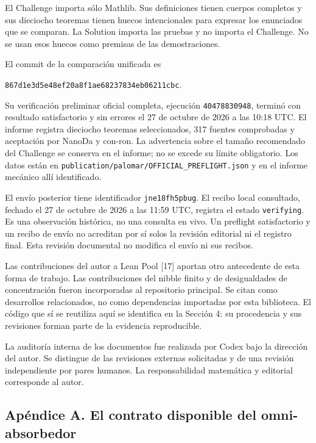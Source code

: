 \documentclass[spanish,11pt,a4paper]{article}
\begin{document}
El Challenge importa sólo Mathlib. Sus definiciones tienen cuerpos completos y sus dieciocho teoremas tienen huecos intencionales para expresar los enunciados que se comparan. La Solution importa las pruebas y no importa el Challenge. No se usan esos huecos como premisas de las demostraciones.

El commit de la comparación unificada es

\texttt{867d1e3d\allowbreak{}5e48ef20\allowbreak{}a8f1ae68\allowbreak{}237834eb\allowbreak{}06211cbc}.

Su verificación preliminar oficial completa, ejecución \texttt{40478830948}, terminó con resultado satisfactorio y sin errores el 27 de octubre de 2026 a las 10:18 UTC. El informe registra dieciocho teoremas seleccionados, 317 fuentes comprobadas y aceptación por NanoDa y con-ron. La advertencia sobre el tamaño recomendado del Challenge se conserva en el informe; no se excede su límite obligatorio. Los datos están en \texttt{publication/\allowbreak{}palomar/\allowbreak{}OFFICIAL\_\allowbreak{}PREFLIGHT.\allowbreak{}json} y en el informe mecánico allí identificado.

El envío posterior tiene identificador \texttt{jne18fh5pbug}. El recibo local consultado, fechado el 27 de octubre de 2026 a las 11:59 UTC, registra el estado \texttt{verifying}. Es una observación histórica, no una consulta en vivo. Un preflight satisfactorio y un recibo de envío no acreditan por sí solos la revisión editorial ni el registro final. Esta revisión documental no modifica el envío ni sus recibos.

Las contribuciones del autor a Lean Pool {[}17{]} aportan otro antecedente de esta forma de trabajo. Las contribuciones del nibble finito y de desigualdades de concentración fueron incorporadas al repositorio principal. Se citan como desarrollos relacionados, no como dependencias importadas por esta biblioteca. El código que sí se reutiliza aquí se identifica en la Sección 4: su procedencia y sus revisiones forman parte de la evidencia reproducible.

La auditoría interna de los documentos fue realizada por Codex bajo la dirección del autor. Se distingue de las revisiones externas solicitadas y de una revisión independiente por pares humanos. La responsabilidad matemática y editorial corresponde al autor.

\subsection{Apéndice A. El contrato disponible del omni-absorbedor}\label{apuxe9ndice-a.-el-contrato-disponible-del-omni-absorbedor}
\end{document}
